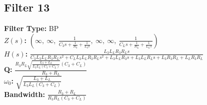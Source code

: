 \documentclass{article}
\begin{document}
\subsection*{Filter 13}
\textbf{Filter Type:} BP \\ 
\textbf{$Z(s)$:} $\left( \infty, \  \infty, \  \frac{1}{C_{3} s + \frac{1}{R_{3}} + \frac{1}{L_{3} s}}, \  \infty, \  \infty, \  \frac{1}{C_{L} s + \frac{1}{R_{L}} + \frac{1}{L_{L} s}}\right)$ \\ 
\textbf{$H(s)$:} $\frac{L_{3} L_{L} R_{3} R_{L} s}{C_{3} L_{3} L_{L} R_{3} R_{L} s^{2} + C_{L} L_{3} L_{L} R_{3} R_{L} s^{2} + L_{3} L_{L} R_{3} s + L_{3} L_{L} R_{L} s + L_{3} R_{3} R_{L} + L_{L} R_{3} R_{L}}$ \\ 
\textbf{Q:} $\frac{R_{3} R_{L} \sqrt{\frac{L_{3} + L_{L}}{L_{3} L_{L} \left(C_{3} + C_{L}\right)}} \left(C_{3} + C_{L}\right)}{R_{3} + R_{L}}$ \\ 
\textbf{$\omega_0$:} $\sqrt{\frac{L_{3} + L_{L}}{L_{3} L_{L} \left(C_{3} + C_{L}\right)}}$ \\ 
\textbf{Bandwidth:} $\frac{R_{3} + R_{L}}{R_{3} R_{L} \left(C_{3} + C_{L}\right)}$ \\ 
\end{document}
